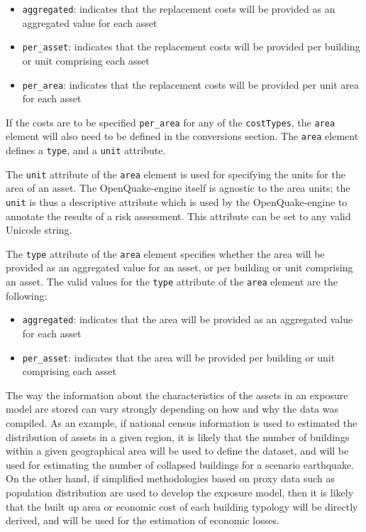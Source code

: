 \begin{itemize}

  \item \Verb+aggregated+: indicates that the replacement costs will be 
    provided as an aggregated value for each asset 

  \item \Verb+per_asset+: indicates that the replacement costs will be 
    provided per building or unit comprising each asset

  \item \Verb+per_area+: indicates that the replacement costs will be 
    provided per unit area for each asset

\end{itemize}

If the costs are to be specified \Verb+per_area+ for any of the
\Verb+costTypes+, the \Verb+area+ element will also need to be defined in the
conversions section. The \Verb+area+ element defines a \Verb+type+, and a
\Verb+unit+ attribute.

The \Verb+unit+ attribute of the \Verb+area+ element is used for specifying
the units for the area of an asset. The OpenQuake-engine itself is agnostic to the
area units; the \Verb+unit+ is thus a descriptive attribute which is used by the
OpenQuake-engine to annotate the results of a risk assessment. This attribute
can be set to any valid Unicode string.

The \Verb+type+ attribute of the \Verb+area+ element specifies whether the
area will be provided as an aggregated value for an asset, or per building or
unit comprising an asset. The valid values for the \Verb+type+ attribute of
the \Verb+area+ element are the following:

\begin{itemize}

  \item \Verb+aggregated+: indicates that the area will be provided as an 
    aggregated value for each asset

  \item \Verb+per_asset+: indicates that the area will be provided per 
    building or unit comprising each asset

\end{itemize}


The way the information about the characteristics of the \glspl{asset} in an
\gls{exposure model} are stored can vary strongly depending on how and why the
data was compiled. As an example, if national census information is used to
estimated the distribution of assets in a given region, it is likely that the
number of buildings within a given geographical area will be used to define
the dataset, and will be used for estimating the number of collapsed buildings
for a scenario earthquake. On the other hand, if simplified methodologies
based on proxy data such as population distribution are used to develop the
exposure model, then it is likely that the built up area or economic cost of
each building typology will be directly derived, and will be used for the
estimation of economic losses.


